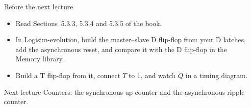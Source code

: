 \documentclass[10pt]{wosm-slides}
\begin{document}
\begin{frame}{Before the next lecture}
  \begin{itemize}
    \item Read Sections~5.3.3, 5.3.4 and 5.3.5 of the book.
    \item In Logisim-evolution, build the master--slave D flip-flop from your D
      latches, add the asynchronous reset, and compare it with the D flip-flop in the
      Memory library.
    \item Build a T flip-flop from it, connect $T$ to 1, and watch $Q$ in a timing
      diagram.
  \end{itemize}

  \begin{block}{Next lecture }
    Counters: the synchronous up counter and the asynchronous ripple counter.
  \end{block}
\end{frame}
\end{document}
